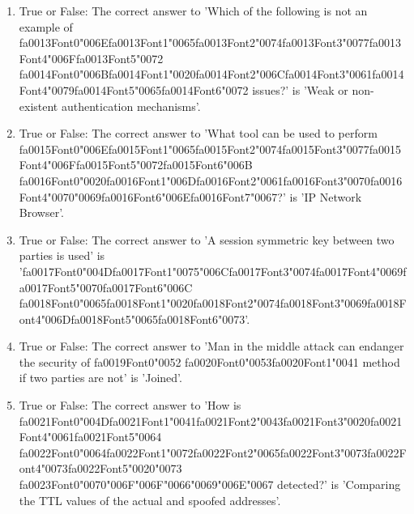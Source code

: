 \documentclass[12pt]{article}
\begin{document}
\begin{enumerate}[label=\arabic*.]
\item True or False: The correct answer to 'Which of the following is not an example of {\csname fa0013Font0\endcsname\char"006E}{\csname fa0013Font1\endcsname\char"0065}{\csname fa0013Font2\endcsname\char"0074}{\csname fa0013Font3\endcsname\char"0077}{\csname fa0013Font4\endcsname\char"006F}{\csname fa0013Font5\endcsname\char"0072} {\csname fa0014Font0\endcsname\char"006B}{\csname fa0014Font1\endcsname\char"0020}{\csname fa0014Font2\endcsname\char"006C}{\csname fa0014Font3\endcsname\char"0061}{\csname fa0014Font4\endcsname\char"0079}{\csname fa0014Font5\endcsname\char"0065}{\csname fa0014Font6\endcsname\char"0072} issues?' is 'Weak or non-existent authentication mechanisms'.
\item True or False: The correct answer to 'What tool can be used to perform {\csname fa0015Font0\endcsname\char"006E}{\csname fa0015Font1\endcsname\char"0065}{\csname fa0015Font2\endcsname\char"0074}{\csname fa0015Font3\endcsname\char"0077}{\csname fa0015Font4\endcsname\char"006F}{\csname fa0015Font5\endcsname\char"0072}{\csname fa0015Font6\endcsname\char"006B} {\csname fa0016Font0\endcsname\char"0020}{\csname fa0016Font1\endcsname\char"006D}{\csname fa0016Font2\endcsname\char"0061}{\csname fa0016Font3\endcsname\char"0070}{\csname fa0016Font4\endcsname\char"0070}{\char"0069}{\csname fa0016Font6\endcsname\char"006E}{\csname fa0016Font7\endcsname\char"0067}?' is 'IP Network Browser'.
\item True or False: The correct answer to 'A session symmetric key between two parties is used' is '{\csname fa0017Font0\endcsname\char"004D}{\csname fa0017Font1\endcsname\char"0075}{\char"006C}{\csname fa0017Font3\endcsname\char"0074}{\csname fa0017Font4\endcsname\char"0069}{\csname fa0017Font5\endcsname\char"0070}{\csname fa0017Font6\endcsname\char"006C} {\csname fa0018Font0\endcsname\char"0065}{\csname fa0018Font1\endcsname\char"0020}{\csname fa0018Font2\endcsname\char"0074}{\csname fa0018Font3\endcsname\char"0069}{\csname fa0018Font4\endcsname\char"006D}{\csname fa0018Font5\endcsname\char"0065}{\csname fa0018Font6\endcsname\char"0073}'.
\item True or False: The correct answer to 'Man in the middle attack can endanger the security of {\csname fa0019Font0\endcsname\char"0052} {\csname fa0020Font0\endcsname\char"0053}{\csname fa0020Font1\endcsname\char"0041} method if two parties are not' is 'Joined'.
\item True or False: The correct answer to 'How is {\csname fa0021Font0\endcsname\char"004D}{\csname fa0021Font1\endcsname\char"0041}{\csname fa0021Font2\endcsname\char"0043}{\csname fa0021Font3\endcsname\char"0020}{\csname fa0021Font4\endcsname\char"0061}{\csname fa0021Font5\endcsname\char"0064} {\csname fa0022Font0\endcsname\char"0064}{\csname fa0022Font1\endcsname\char"0072}{\csname fa0022Font2\endcsname\char"0065}{\csname fa0022Font3\endcsname\char"0073}{\csname fa0022Font4\endcsname\char"0073}{\csname fa0022Font5\endcsname\char"0020}{\char"0073} {\csname fa0023Font0\endcsname\char"0070}{\char"006F}{\char"006F}{\char"0066}{\char"0069}{\char"006E}{\char"0067} detected?' is 'Comparing the TTL values of the actual and spoofed addresses'.

\end{enumerate}
\end{document}
